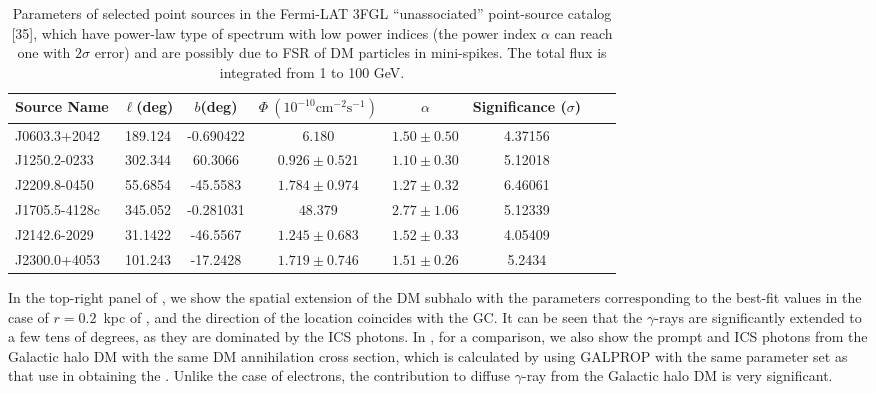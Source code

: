 \begin{table}[htbp]
	\centering
		\begin{tabular}{l|cc|cccc|c} 
		\hline\hline
        Source Name & $\ell$(deg) & $b$(deg) & $\Phi\ (10^{-10}\text{cm}^{-2}\text{s}^{-1})$ & $\alpha$ & Significance ($\sigma$) \\
     \hline
     J0603.3+2042 & 189.124 & -0.690422 & $6.180$ & $1.50\pm0.50$ & 4.37156 \\
     J1250.2-0233 & 302.344 & 60.3066 & $0.926\pm0.521$ & $1.10\pm0.30$ & 5.12018 \\
     J2209.8-0450 & 55.6854 & -45.5583 & $1.784\pm0.974$ & $1.27\pm0.32$ & 6.46061 \\
     J1705.5-4128c & 345.052 & -0.281031 & $48.379$ & $2.77 \pm1.06$ & 5.12339 \\
     J2142.6-2029 & 31.1422 & -46.5567 & $1.245\pm0.683$ & $1.52\pm0.33$ & 4.05409 \\
     J2300.0+4053 & 101.243 & -17.2428 & $1.719\pm0.746$ & $1.51\pm0.26$ & 5.2434 \\
		\hline\hline
	 \end{tabular}%
	 \caption{
	 Parameters of selected point sources in the Fermi-LAT 3FGL  ``unassociated'' point-source catalog [35], %
	 which have power-law type of spectrum with low power indices (the power
	 index $\alpha$ can reach one with $2\sigma$ error) and are possibly due to  FSR of
	 DM particles in mini-spikes. The total flux is integrated from 
	 1 to 100 GeV. %
	}
	\label{tab:3FGL}%
\end{table}%



In the top-right panel of , 
we show the spatial extension of the DM subhalo
with the parameters corresponding to 
the best-fit values  in the case of $r=0.2$~kpc of ,
and the direction of the location  coincides with the GC.
It can be seen that the $\gamma$-rays are significantly extended to 
a few tens of degrees, as they are dominated by the ICS photons.
In , for a comparison, 
we also show the prompt and ICS photons from 
the Galactic halo DM with the same DM annihilation cross section,
which is calculated by using  GALPROP with the same parameter set
as that use in obtaining the .
Unlike the case of electrons, the contribution to  diffuse $\gamma$-ray
from the Galactic halo DM is very significant.


